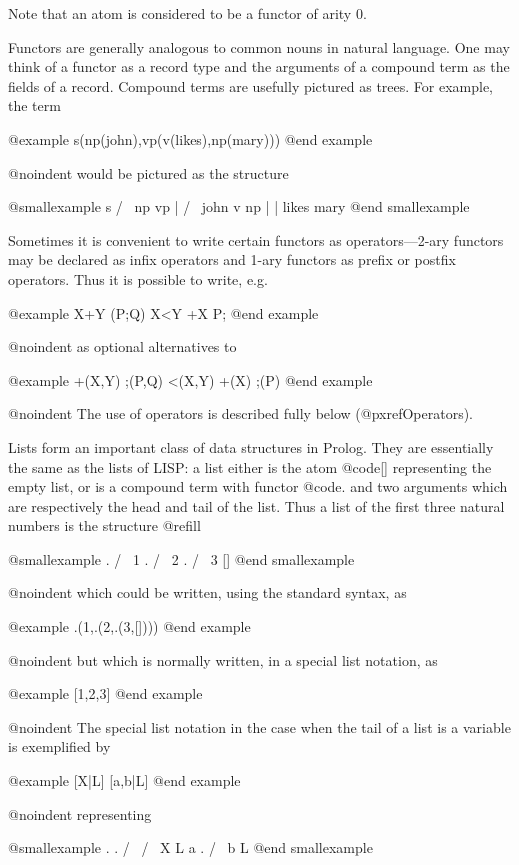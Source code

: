 {Note that an atom is considered to be a functor of arity 0.

Functors are generally analogous to common nouns in natural language.  One
may think of a functor as a record type and the arguments of a compound
term as the fields of a record.  Compound terms are usefully pictured as
trees.  For example, the term

@example
s(np(john),vp(v(likes),np(mary)))
@end example

@noindent
would be pictured as the structure

@smallexample
       s
     /   \
  np       vp
  |       /  \
john     v     np
         |     |
       likes  mary
@end smallexample

Sometimes it is convenient to write certain functors as operators---2-ary
functors may be declared as infix operators and 1-ary functors as prefix or
postfix operators.  Thus it is possible to write, e.g.

@example
X+Y     (P;Q)     X<Y      +X     P;
@end example

@noindent
as optional alternatives to 

@example
+(X,Y)   ;(P,Q)   <(X,Y)   +(X)   ;(P)
@end example

@noindent
The use of operators is described fully below (@pxref{Operators}).

Lists form an important class of data structures in Prolog.  They are
essentially the same as the lists of LISP: a list either is the atom
@code{[]} representing the empty list, or is a compound term with
functor @code{.} and two arguments which are respectively the head and
tail of the list.  Thus a list of the first three natural numbers is the
structure @refill

@smallexample
  .
 / \
1    .
    / \
   2    .
       / \
      3   []
@end smallexample

@noindent
which could be written, using the standard syntax, as 

@example
.(1,.(2,.(3,[])))
@end example

@noindent
but which is normally written, in a special list notation, as 

@example
[1,2,3]
@end example

@noindent
The special list notation in the case when the tail of a list is a variable
is exemplified by

@example
[X|L]     [a,b|L]
@end example

@noindent
representing

@smallexample
   .               .
  / \             / \
X     L         a     .
                     / \
                   b     L
@end smallexample

}
